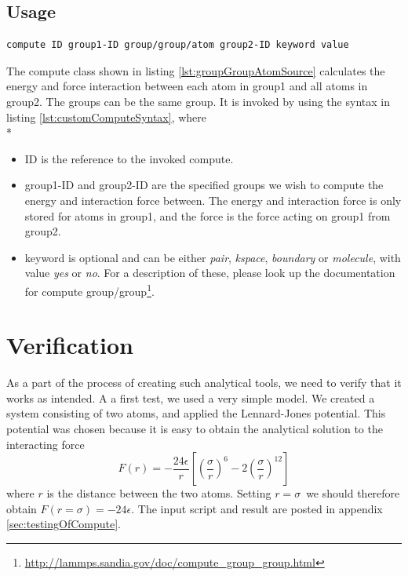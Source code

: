 \documentclass[twoside,english]{uiofysmaster}
\newcommand\lr[1]{\left(#1\right)}
\begin{document}
\subsection{Usage}

 \begin{lstlisting}[language=LammpsInput, caption={Syntax for using custom compute}, label={lst:customComputeSyntax} ]
	compute ID group1-ID group/group/atom group2-ID keyword value
\end{lstlisting}
The compute class shown in listing \ref{lst:groupGroupAtomSource} calculates the energy and force interaction between each atom in group1 and all atoms in group2. The groups can be the same group. It is invoked by using the syntax in listing \ref{lst:customComputeSyntax},
where \\*
\begin{itemize}
	\item ID is the reference to the invoked compute.
	\item group1-ID and group2-ID are the specified groups we wish to compute the energy and interaction force between. The energy and interaction force is only stored for atoms in group1, and the force is the force acting on group1 from group2.
	\item keyword is optional and can be either \textit{pair}, \textit{kspace}, \textit{boundary} or \textit{molecule}, with value \textit{yes} or \textit{no}. For a description of these, please look up the documentation for compute group/group\footnote{\href{http://lammps.sandia.gov/doc/compute_group_group.html}{\url{http://lammps.sandia.gov/doc/compute_group_group.html}}}. 
\end{itemize}



\section{Verification}
As a part of the process of creating such analytical tools, we need to verify that it works as intended. 
A a first test, we used a very simple model. 
We created a system consisting of two atoms, and applied the Lennard-Jones potential. 
This potential was chosen because it is easy to obtain the analytical solution to the interacting force
\begin{equation}
	F(r) = -\frac{24\epsilon}{r}\left[ \lr{\frac{\sigma}{r}}^{6} - 2\lr{\frac{\sigma}{r}}^{12} \right] 
\end{equation} 
where $r$ is the distance between the two atoms.
Setting $r=\sigma$ we should therefore obtain $F(r=\sigma)=-24\epsilon$.
The input script and result are posted in appendix \ref{sec:testingOfCompute}.
\end{document}
